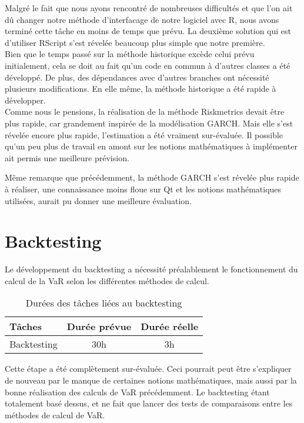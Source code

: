 \documentclass[a4paper]{report}
\begin{document}
Malgré le fait que nous ayons rencontré de nombreuses difficultés et que l'on ait dû changer notre méthode d'interfacage de notre logiciel avec R, nous avons terminé cette tâche en moins de temps que prévu. La deuxième solution qui est d'utiliser RScript s'est révelée beaucoup plus simple que notre première.\\

Bien que le temps passé sur la méthode historique excède celui prévu initialement, cela se doit au fait qu'un code en commun à d'autres classes a été développé. De plus, des dépendances avec d'autres branches ont nécessité plusieurs modifications.
En elle même, la méthode historique a été rapide à développer.\\

Comme nous le pensions, la réalisation de la méthode Riskmetrics devait être plus rapide, car grandement inspirée de la modélisation GARCH. Mais elle s'est révelée encore plus rapide, l'estimation a été vraiment sur-évaluée. Il possible qu'un peu plus de travail en amont sur les notions mathématiques à implémenter ait permis une meilleure prévision.

Même remarque que précédemment, la méthode GARCH s'est révelée plus rapide à réaliser, une connaissance moins floue sur Qt et les notions mathématiques utilisées, aurait pu donner une meilleure évaluation.

\section{Backtesting}
Le développement du backtesting a nécessité préalablement le fonctionnement du calcul de la VaR selon les différentes méthodes de calcul.

\begin{table}[H]
\centering
  \begin{tabularx}{0.8\textwidth}{| X | c | c |}
    \hline
	Tâches & Durée prévue & Durée réelle \\
    \hline
    Backtesting &  30h & 3h\\
    \hline
  \end{tabularx}
  \caption{Durées des tâches liées au backtesting}
\end{table}

Cette étape a été complètement sur-évaluée. Ceci pourrait peut être s'expliquer de nouveau par le manque de certaines notions mathématiques, mais aussi par la bonne réalisation des calculs de VaR précédemment. Le backtesting étant totalement basé dessus, et ne fait que lancer des tests de comparaisons entre les méthodes de calcul de VaR.
\end{document}
